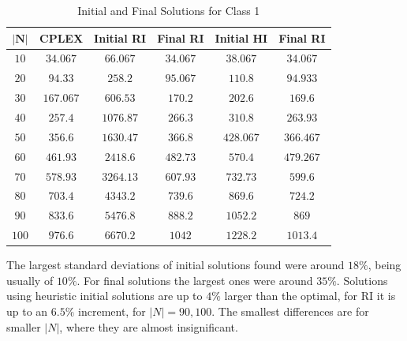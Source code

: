 \documentclass[a4paper,12pt]{article}
\begin{document}
	\begin{table}[H]
		\centering
		\begin{tabular}{c|c|c|c|c|c}
			$ \mathbf{|N|}$	& \textbf{CPLEX}& \textbf{Initial RI}   & \textbf{Final RI}	& \textbf{Initial HI} 	& \textbf{Final RI} \\ \hline
			$ 10  $			& $ 34.067 $ 	& $ 66.067 $ 			& $ 34.067 $  		& $ 38.067 $ 			& $ 34.067 $		\\ \hline
			$ 20  $			& $ 94.33 $ 	& $ 258.2 $ 			& $ 95.067 $  		& $ 110.8 $ 			& $ 94.933 $		\\ \hline
			$ 30  $			& $ 167.067 $ 	& $ 606.53 $ 			& $ 170.2 $  		& $ 202.6 $ 			& $ 169.6 $ 		\\ \hline
			$ 40  $			& $ 257.4 $ 	& $ 1076.87 $ 			& $ 266.3 $  		& $ 310.8 $ 			& $ 263.93 $ 		\\ \hline
			$ 50  $			& $ 356.6 $ 	& $ 1630.47 $ 			& $ 366.8 $  		& $ 428.067 $ 			& $ 366.467 $ 		\\ \hline
			$ 60  $			& $ 461.93 $ 	& $ 2418.6 $ 			& $ 482.73 $  		& $ 570.4 $ 			& $ 479.267 $ 		\\ \hline
			$ 70 $			& $ 578.93 $ 	& $ 3264.13 $ 			& $ 607.93 $ 	 	& $ 732.73 $	 		& $ 599.6 $ 		\\ \hline
			$ 80 $			& $ 703.4 $ 	& $ 4343.2 $ 			& $ 739.6 $  		& $ 869.6 $ 			& $ 724.2 $ 		\\ \hline
			$ 90 $			& $ 833.6 $ 	& $ 5476.8 $ 			& $ 888.2 $  		& $ 1052.2 $ 			& $ 869 $ 			\\ \hline
			$ 100 $			& $ 976.6 $ 	& $ 6670.2 $ 			& $ 1042 $  		& $ 1228.2 $ 			& $ 1013.4 $ 		\\
		\end{tabular}
		\caption{Initial and Final Solutions for Class 1}
		\label{table:sols}
	\end{table}

	The largest standard deviations of initial solutions found were around $18\%$, being usually of $10\%$.
	For final solutions the largest ones were around $35\%$.
	Solutions using heuristic initial solutions are up to $4\%$ larger than the optimal, for RI it is up to an $6.5\%$ increment, for $|N| = 90,100$.
	The smallest differences are for smaller $ |N| $, where they are almost insignificant.
	
\end{document}
